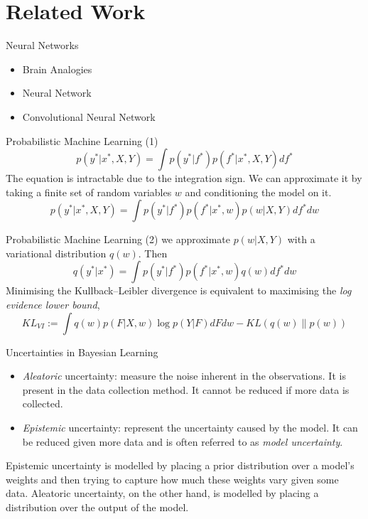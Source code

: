 \documentclass{beamer}
\begin{document}
\section{Related Work}
\begin{frame}{Neural Networks}
  \begin{itemize}
    \item<1-> Brain Analogies
    \item<1-> Neural Network
    \item<1-> Convolutional Neural Network
  \end{itemize}
\end{frame}
\begin{frame}{Probabilistic Machine Learning (1)}
  \begin{equation}
    p(y^*|x^*, X, Y) = \int p(y^*|f^*)p(f^*|x^*, X, Y) df^*
  \end{equation}
  The equation is intractable due to the integration sign. We can approximate it by taking a finite set of random variables $w$ and conditioning the model on it.
  \[
    p(y^*|x^*, X, Y) = \int p(y^*|f^*)p(f^*|x^*, w)p(w|X, Y) df^*dw
  \]
\end{frame}
\begin{frame}{Probabilistic Machine Learning (2)}
  we approximate $p(w|X, Y)$ with a variational distribution $q(w)$. Then
  \begin{equation}
    q(y^*|x^*) = \int p(y^*|f^*)p(f^*|x^*, w)q(w)df^*dw
  \end{equation}
  Minimising the Kullback–Leibler divergence is equivalent to maximising the \textit{log evidence lower bound},
  \begin{equation}
    KL_{VI} := \int q(w)p(F|X, w) \log p(Y|F) dFdw - KL(q(w)\|p(w))
  \end{equation}
\end{frame}
\begin{frame}{Uncertainties in Bayesian Learning}
  \begin{itemize}
    \item<1-> \textit{Aleatoric} uncertainty: measure the noise inherent in the observations. 
    It is present in the data collection method. It cannot be reduced if more data is collected.
    \item<1-> \textit{Epistemic} uncertainty: represent the uncertainty caused by the model.
    It can be reduced given more data and is often referred to as \textit{model uncertainty}.
  \end{itemize}
  Epistemic uncertainty is modelled by placing a prior distribution over a model’s weights and then trying to capture how much these weights
vary given some data. Aleatoric uncertainty, on the other hand, is modelled by placing a
distribution over the output of the model.
\end{frame}
\end{document}
